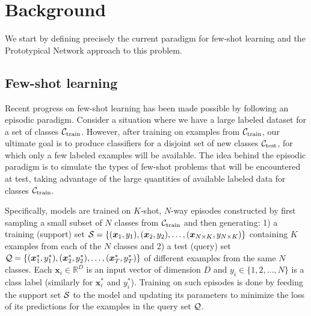 \section{Background}

We start by defining precisely the current paradigm for few-shot learning and the Prototypical
Network approach to this problem.

\subsection{Few-shot learning}

Recent progress on few-shot learning has been made possible by following an episodic paradigm.
Consider a situation where we have a large labeled dataset for a set of classes ${\cal C}_{\rm
train}$. However, after training on examples from ${\cal C}_{\rm train}$, our ultimate goal is to
produce classifiers for a disjoint set of new classes ${\cal C}_{\rm test}$, for which only a few
labeled examples will be available. The idea behind the episodic paradigm is to simulate the types
of few-shot problems that will be encountered at test, taking advantage of the large quantities of
available labeled data for classes ${\cal C}_{\rm train}$.


Specifically, models are trained on $K$-shot, $N$-way episodes constructed by first sampling a small subset of $N$ classes from ${\cal C}_{\rm train}$ and then generating:
1) a training (support) set ${\cal S}=\{(\bm{x}_1,y_1), (\bm{x}_2,y_2),
\dots, (\bm{x}_{N\times K},y_{N\times K})\}$ containing $K$ examples from each of the $N$ classes and 2) a test (query) set ${\cal Q}=\{(\bm{x}^*_1,y^*_1), (\bm{x}^*_2,y^*_2),
\dots, (\bm{x}^*_T,y^*_T)\}$ of different examples from the same $N$ classes. Each $\bm{x}_i \in \mathbb{R}^D$ is an input vector of
dimension $D$ and $y_i \in \{1, 2, \dots, N\}$ is a class label (similarly for $\bm{x}^*_i$ and $y^*_i$). Training on such episodes is done by feeding the support set ${\cal S}$ to the model and updating its parameters to minimize the loss of its predictions for the examples in the query set ${\cal Q}$.

